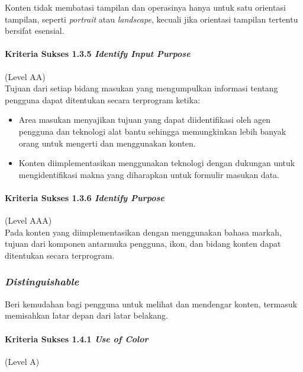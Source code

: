 \documentclass[a4paper,twoside]{article}
\begin{document}
\begin{enumerate}
		Konten tidak membatasi tampilan dan operasinya hanya untuk satu orientasi tampilan, seperti \textit{portrait} atau \textit{landscape}, kecuali jika orientasi tampilan tertentu bersifat esensial.

		\paragraph{Kriteria Sukses 1.3.5 \textit{Identify Input Purpose}}
		\label{sec:kriteria_sukses_1.3.5}
		(Level AA)\\

		Tujuan dari setiap bidang masukan yang mengumpulkan informasi tentang pengguna dapat ditentukan secara terprogram ketika:
		\begin{itemize}
			\item Area masukan menyajikan tujuan yang dapat diidentifikasi oleh agen pengguna dan teknologi alat bantu sehingga memungkinkan lebih banyak orang untuk mengerti dan menggunakan konten.
			\item Konten diimplementasikan menggunakan teknologi dengan dukungan untuk mengidentifikasi makna yang diharapkan untuk formulir masukan data.
		\end{itemize}

		\paragraph{Kriteria Sukses 1.3.6 \textit{Identify Purpose}}
		\label{sec:kriteria_sukses_1.3.6}
		(Level AAA)\\

		Pada konten yang diimplementasikan dengan menggunakan bahasa markah, tujuan dari komponen antarmuka pengguna, ikon, dan bidang konten dapat ditentukan secara terprogram.

		\subsubsection*{\textit{Distinguishable}}
		\label{sec:distinguishable}
		Beri kemudahan bagi pengguna untuk melihat dan mendengar konten, termasuk memisahkan latar depan dari latar belakang.

		\paragraph{Kriteria Sukses 1.4.1 \textit{Use of Color}}
		\label{sec:kriteria_sukses_1.4.1}
		(Level A)\\


\end{enumerate}
\end{document}

